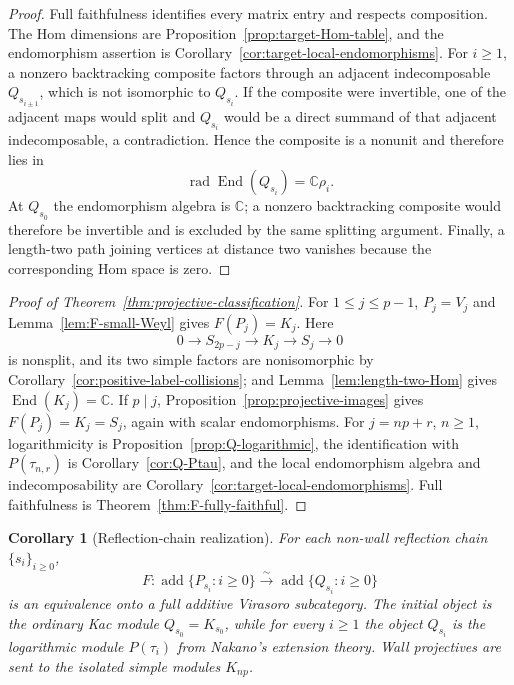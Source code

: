 \documentclass[12pt,leqno]{amsart}
\numberwithin{equation}{section}
\newtheorem{cor}[thm]{Corollary}
\newcommand{\End}{\operatorname{End}}
\newcommand{\rad}{\operatorname{rad}}
\def\C{\mathbb{C}}
\begin{document}
\begin{proof}
Full faithfulness identifies every matrix entry and respects composition.
The Hom dimensions are Proposition~\ref{prop:target-Hom-table}, and the
endomorphism assertion is Corollary~\ref{cor:target-local-endomorphisms}.
For $i\ge1$, a nonzero backtracking composite factors through an adjacent
indecomposable $Q_{s_{i\pm1}}$, which is not isomorphic to $Q_{s_i}$.  If
the composite were invertible, one of the adjacent maps would split and
$Q_{s_i}$ would be a direct summand of that adjacent indecomposable, a
contradiction.  Hence the composite is a nonunit and therefore lies in
\[
 \rad\End(Q_{s_i})=\C\rho_i.
\]
At $Q_{s_0}$ the endomorphism algebra is $\C$; a nonzero backtracking
composite would therefore be invertible and is excluded by the same
splitting argument.  Finally, a length-two path joining vertices at
distance two vanishes because the corresponding Hom space is zero.
\end{proof}

\begin{proof}[Proof of Theorem~\ref{thm:projective-classification}]
For $1\le j\le p-1$, $P_j=V_j$ and
Lemma~\ref{lem:F-small-Weyl} gives $F(P_j)=K_j$.  Here
\[
 0\longrightarrow S_{2p-j}\longrightarrow K_j
 \longrightarrow S_j\longrightarrow0
\]
is nonsplit, and its two simple factors are nonisomorphic by
Corollary~\ref{cor:positive-label-collisions}; and Lemma~\ref{lem:length-two-Hom} gives
$\End(K_j)=\C$.  If
$p\mid j$, Proposition~\ref{prop:projective-images} gives
$F(P_j)=K_j=S_j$, again with scalar endomorphisms.  For
$j=np+r$, $n\ge1$, logarithmicity is Proposition~\ref{prop:Q-logarithmic},
the identification with $P(\tau_{n,r})$ is Corollary~\ref{cor:Q-Ptau}, and
the local endomorphism algebra and indecomposability are
Corollary~\ref{cor:target-local-endomorphisms}.  Full faithfulness is
Theorem~\ref{thm:F-fully-faithful}.
\end{proof}

\begin{cor}[Reflection-chain realization]\label{cor:blockwise-projective-realization}
For each non-wall reflection chain $\{s_i\}_{i\ge0}$,
\[
 F:\operatorname{add}\{P_{s_i}:i\ge0\}
 \xrightarrow{\ \sim\ }
 \operatorname{add}\{Q_{s_i}:i\ge0\}
\]
is an equivalence onto a full additive Virasoro subcategory.  The initial
object is the ordinary Kac module $Q_{s_0}=K_{s_0}$, while for every
$i\ge1$ the object $Q_{s_i}$ is the logarithmic module $P(\tau_i)$ from
Nakano's extension theory.  Wall projectives are sent to the isolated
simple modules $K_{np}$.
\end{cor}
\end{document}
